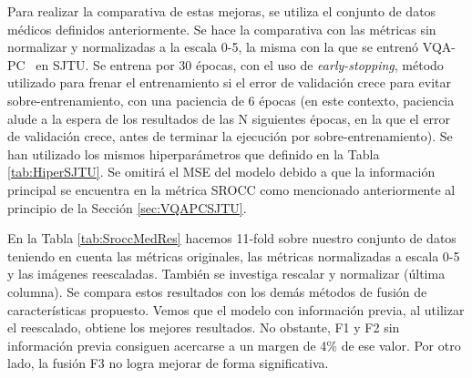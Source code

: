 Para realizar la comparativa de estas mejoras, se utiliza el conjunto de datos 
médicos definidos anteriormente. Se hace la comparativa con las métricas sin 
normalizar y normalizadas a la escala 0-5, la misma con la que se entrenó VQA-PC~\cite{VQA-PC} en SJTU. 
Se entrena por 30 épocas, con el uso de \emph{early-stopping}, método utilizado para frenar el entrenamiento 
si el error de validación crece para evitar sobre-entrenamiento, con una paciencia 
de 6 épocas (en este contexto, paciencia alude a la espera de los resultados de 
las N siguientes épocas, en la que el error de validación crece, antes de terminar 
la ejecución por sobre-entrenamiento). 
Se han utilizado los mismos hiperparámetros que definido en la Tabla \ref{tab:HiperSJTU}.
Se omitirá el MSE del modelo debido a que la información principal se encuentra 
en la métrica SROCC como mencionado anteriormente al principio de la Sección \ref{sec:VQAPCSJTU}.

En la Tabla \ref{tab:SroccMedRes} hacemos 11-fold sobre nuestro conjunto de datos teniendo en cuenta las métricas originales, las métricas
normalizadas a escala 0-5 y las imágenes reescaladas. También se investiga rescalar y normalizar (última columna).
Se compara estos resultados con los demás métodos de fusión de características propuesto.
Vemos que el modelo con información previa, al utilizar el reescalado, obtiene los mejores resultados.
No obstante, F1 y F2 sin información previa consiguen acercarse a un margen de 4\% de ese valor. 
Por otro lado, la fusión F3 no logra mejorar de forma significativa. 

